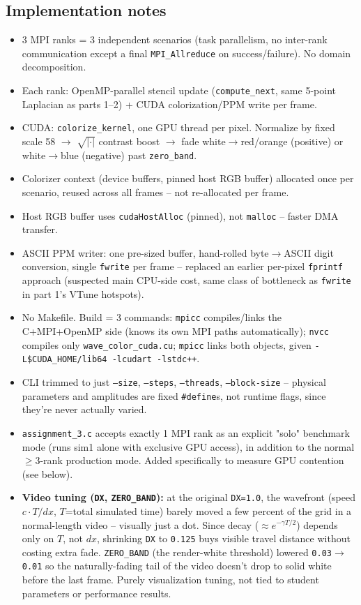 \subsection{Implementation notes}
\begin{itemize}
\item 3 MPI ranks = 3 independent scenarios (task parallelism, no inter-rank communication except a final \texttt{MPI\_Allreduce} on success/failure). No domain decomposition.
\item Each rank: OpenMP-parallel stencil update (\texttt{compute\_next}, same 5-point Laplacian as parts 1--2) + CUDA colorization/PPM write per frame.
\item CUDA: \texttt{colorize\_kernel}, one GPU thread per pixel. Normalize by fixed scale 58 $\to$ $\sqrt{|\cdot|}$ contrast boost $\to$ fade white$\to$red/orange (positive) or white$\to$blue (negative) past \texttt{zero\_band}.
\item Colorizer context (device buffers, pinned host RGB buffer) allocated once per scenario, reused across all frames -- not re-allocated per frame.
\item Host RGB buffer uses \texttt{cudaHostAlloc} (pinned), not \texttt{malloc} -- faster DMA transfer.
\item ASCII PPM writer: one pre-sized buffer, hand-rolled byte$\to$ASCII digit conversion, single \texttt{fwrite} per frame -- replaced an earlier per-pixel \texttt{fprintf} approach (suspected main CPU-side cost, same class of bottleneck as \texttt{fwrite} in part 1's VTune hotspots).
\item No Makefile. Build = 3 commands: \texttt{mpicc} compiles/links the C+MPI+OpenMP side (knows its own MPI paths automatically); \texttt{nvcc} compiles only \texttt{wave\_color\_cuda.cu}; \texttt{mpicc} links both objects, given \texttt{-L\$CUDA\_HOME/lib64 -lcudart -lstdc++}.
\item CLI trimmed to just \texttt{--size}, \texttt{--steps}, \texttt{--threads}, \texttt{--block-size} -- physical parameters and amplitudes are fixed \texttt{\#define}s, not runtime flags, since they're never actually varied.
\item \texttt{assignment\_3.c} accepts exactly 1 MPI rank as an explicit "solo" benchmark mode (runs sim1 alone with exclusive GPU access), in addition to the normal $\geq 3$-rank production mode. Added specifically to measure GPU contention (see below).
\item \textbf{Video tuning (\texttt{DX}, \texttt{ZERO\_BAND}):} at the original \texttt{DX=1.0}, the wavefront (speed $c\cdot T/dx$, $T$=total simulated time) barely moved a few percent of the grid in a normal-length video -- visually just a dot. Since decay ($\approx e^{-\gamma T/2}$) depends only on $T$, not $dx$, shrinking \texttt{DX} to \texttt{0.125} buys visible travel distance without costing extra fade. \texttt{ZERO\_BAND} (the render-white threshold) lowered \texttt{0.03}$\to$\texttt{0.01} so the naturally-fading tail of the video doesn't drop to solid white before the last frame. Purely visualization tuning, not tied to student parameters or performance results.
\end{itemize}


